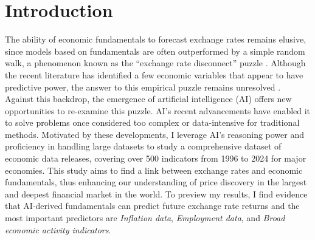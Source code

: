 \documentclass[12pt,oneside,letter]{article}
\begin{document}
	
	\thispagestyle{empty}
	\newpage
	
	\setcounter{page}{1}
	
	
	
		
	\section{Introduction} \label{sec:introduction} 
	The ability of economic fundamentals to forecast exchange rates remains elusive, since models based on fundamentals are often outperformed by a simple random walk, a phenomenon known as the “exchange rate disconnect” puzzle \citep*[e.g.,][]{Meese/Rogoff:1983}.  Although the recent literature has identified a few economic variables that appear to have predictive power, the answer to this empirical puzzle remains unresolved \citep*[e.g.,][]{MARK:1995, ENGEL/WEST:2005, ROSSI:2013}.\\
	Against this backdrop, the emergence of artificial intelligence (AI) offers new opportunities to re-examine this puzzle. AI's recent advancements have enabled it to solve problems once considered too complex or data-intensive for traditional methods. Motivated by these developments, I leverage AI’s reasoning power and proficiency in handling large datasets to study a comprehensive dataset of economic data releases, covering over 500 indicators from 1996 to 2024 for major economies. This study aims to find a link between exchange rates and economic fundamentals, thus enhancing our understanding of price discovery in the largest and deepest financial market in the world. To preview my results, I find evidence that AI-derived fundamentals can predict future exchange rate returns and the most important predictors are \textit{Inflation data}, \textit{Employment data}, and \textit{Broad economic activity indicators}.\\
\end{document}
